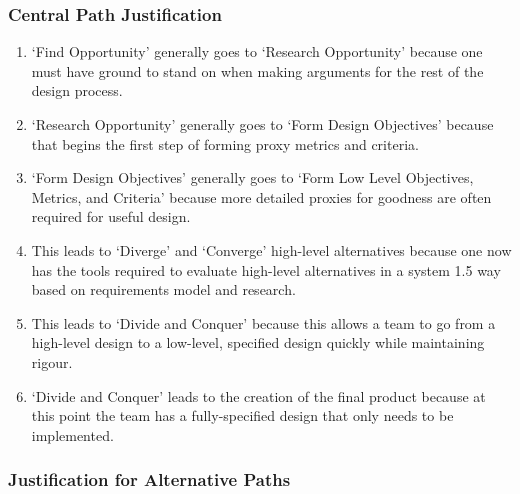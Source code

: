 \documentclass[a4paper,12pt]{article}
\begin{document}
\subsubsection{Central Path Justification}
\begin{enumerate}
	\item ‘Find Opportunity’ generally goes to ‘Research Opportunity’ because one must have ground to stand on when making arguments for the rest of the design process.
	\item ‘Research Opportunity’ generally goes to ‘Form Design Objectives’ because that begins the first step of forming proxy metrics and criteria.
	\item ‘Form Design Objectives’ generally goes to ‘Form Low Level Objectives, Metrics, and Criteria’ because more detailed proxies for goodness are often required for useful design.
	\item This leads to ‘Diverge’ and ‘Converge’ high-level alternatives because one now has the tools required to evaluate high-level alternatives in a system 1.5 way based on requirements model and research.
	\item This leads to ‘Divide and Conquer’ because this allows a team to go from a high-level design to a low-level, specified design quickly while maintaining rigour.
	\item ‘Divide and Conquer’ leads to the creation of the final product because at this point the team has a fully-specified design that only needs to be implemented.
\end{enumerate}

\subsubsection{Justification for Alternative Paths}
\end{document}
